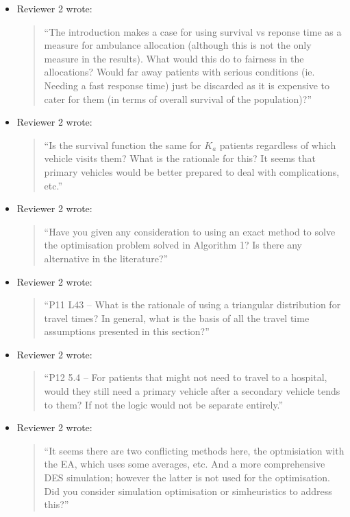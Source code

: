 \documentclass{article}
\begin{document}
\begin{itemize}

\item Reviewer 2 wrote:
\begin{quote}
``The introduction makes a case for using survival vs reponse time as a measure for ambulance allocation (although this is not the only measure in the results). What would this do to fairness in the allocations? Would far away patients with serious conditions (ie. Needing a fast response time) just be discarded as it is expensive to cater for them (in terms of overall survival of the population)?''
\end{quote}

\item Reviewer 2 wrote:
\begin{quote}
``Is the survival function the same for $K_a$ patients regardless of which vehicle visits them? What is the rationale for this? It seems that primary vehicles would be better prepared to deal with complications, etc.''
\end{quote}

\item Reviewer 2 wrote:
\begin{quote}
``Have you given any consideration to using an exact method to solve the optimisation problem solved in Algorithm 1? Is there any alternative in the literature?''
\end{quote}

\item Reviewer 2 wrote:
\begin{quote}
``P11 L43 – What is the rationale of using a triangular distribution for travel times? In general, what is the basis of all the travel time assumptions presented in this section?''
\end{quote}

\item Reviewer 2 wrote:
\begin{quote}
``P12 5.4 – For patients that might not need to travel to a hospital, would they still need a primary vehicle after a secondary vehicle tends to them? If not the logic would not be separate entirely.''
\end{quote}

\item Reviewer 2 wrote:
\begin{quote}
``It seems there are two conflicting methods here, the optmisiation with the EA, which uses some averages, etc. And a more comprehensive DES simulation; however the latter is not used for the optimisation. Did you consider simulation optimisation or simheuristics to address this?''
\end{quote}


\end{itemize}
\end{document}
